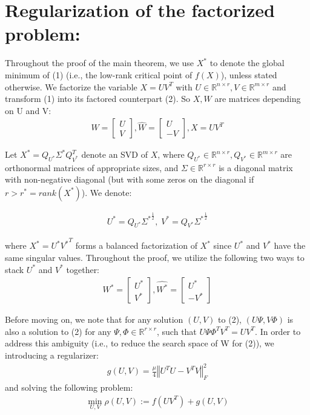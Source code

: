 \documentclass{article}
\begin{document}
\section{Regularization of the factorized problem:}

Throughout the proof of the main theorem, we use $X^*$ to denote the global minimum of (1) (i.e., the low-rank critical point of $f(X)$), unless stated otherwise. We factorize the variable $X =UV^T$ with $U\in \mathbb{R}^{n\times r} , V\in \mathbb{R}^{m\times r}$ and transform (1) into its factored counterpart (2). So $X,W$ are matrices depending on U and V:
\begin{align*}
        W=\left[\begin{array}{c}
U\\
V
\end{array}\right],\hat{W}=\left[\begin{array}{c}
U\\
-V
\end{array}\right],X=UV^{T}
\end{align*}

Let $X^* = Q_{U^*}\Sigma^*Q_{V^*}^T$ denote an SVD of $X$, where $Q_{U^*}\in \mathbb{R}^{n\times r}, Q_{V^*}\in \mathbb{R}^{m\times r}$ are orthonormal matrices of appropriate sizes, and $\Sigma\in\mathbb{R}^{r\times r}$ is a diagonal matrix with non-negative diagonal (but with some zeros on the diagonal if $r > r^*= rank(X^*)$). We denote:

\begin{align*}
    U^* = Q_{U^*}{\Sigma^*}^{\frac{1}{2}}, \; V^* = Q_{V^*}{\Sigma^*}^{\frac{1}{2}}
\end{align*}

where $X^* = U^* {V^*}^T$ forms a balanced factorization of $X^*$ since $U^*$ and $V^*$ have the same singular values. Throughout the proof, we utilize the following two ways to stack $U^*$ and $V^*$ together:
\begin{align*}
        W^*=\left[\begin{array}{c}
U^*\\
V^*
\end{array}\right],\hat{W^*}=\left[\begin{array}{c}
U^*\\
-V^*
\end{array}\right]
\end{align*}

Before moving on, we note that for any solution $(U , V )$ to (2), $(U\Psi, V\Phi)$ is also a solution to (2) for any $\Psi,\Phi\in\mathbb{R}^{r\times r}$, such that $U\Psi\Phi^T V^T = UV^T$. In order to address this ambiguity (i.e., to reduce the search space of W for (2)), we introducing a regularizer:
\begin{align}
    g\left(U,V\right)=\frac{\mu}{4}\left\Vert U^TU-V^TV\right\Vert^2_F
\end{align}
and solving the following problem:
\begin{align}
    {\min}_{U,V}\rho\left(U,V\right):=f\left(UV^T\right) + g\left(U,V\right)
\end{align}
\end{document}
